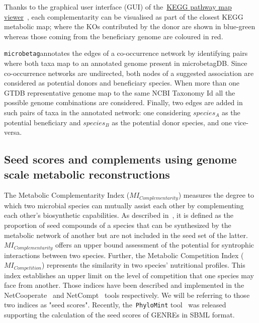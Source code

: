 \documentclass[sn-mathphys,Numbered]{sn-jnl}  %
\theoremstyle{thmstyleone}%
\theoremstyle{thmstyletwo}%
\theoremstyle{thmstylethree}%
\newcommand{\microbetag}{\texttt{microbetag}}
\begin{document}
        Thanks to the graphical user interface (GUI) of the~\href{https://www.kegg.jp/kegg/docs/color_gui.html}{KEGG pathway map viewer}~\cite{kanehisa2020kegg,kanehisa2022kegg}, 
        each complementarity can be visualised as part of the closest KEGG metabolic map; 
        where the KOs contributed by the donor are shown in blue-green whereas those coming from the beneficiary genome are coloured in red.

        \microbetag annotates the edges of a co-occurrence network by identifying pairs where both taxa map to an annotated genome present in microbetagDB.
        Since co-occurrence networks are undirected, both nodes of a suggested association are considered as potential donors and beneficiary species. 
        When more than one GTDB representative genome map to the same NCBI Taxonomy Id all the possible genome combinations are considered.
        Finally, two edges are added in such pairs of taxa in the annotated network: 
        one considering $species_A$ as the potential beneficiary and $species_B$ as the potential donor species, and one vice-versa. 


    \subsection*{Seed scores and complements using genome scale metabolic reconstructions }
    \label{subsec:seeds}

        The Metabolic Complementarity Index ($MI_{Complementarity}$) measures the degree to which two microbial species can mutually assist each other by complementing each other's biosynthetic capabilities.
        As described in~\cite{phylomint_ms}, it is defined as the proportion of seed compounds of a species that can be synthesized by the metabolic network of another but are not included in the seed set of the latter. 
        $MI_{Complementarity}$ offers an upper bound assessment of the potential for syntrophic interactions between two species.
        Further, the Metabolic Competition Index ($MI_{Competition}$) represents the similarity in two species' nutritional profiles. 
        This index establishes an upper limit on the level of competition that one species may face from another.
        Those indices have been described and implemented in the NetCooperate~\cite{levy2015netcooperate} and NetCompt~\cite{kreimer2012netcmpt} tools respectively.
        We will be referring to those two indices as "seed scores".
        Recently, the~\texttt{PhyloMint} tool~\cite{phylomint_ms} was released supporting the calculation of the seed scores of GENREs in SBML format.
\end{document}
